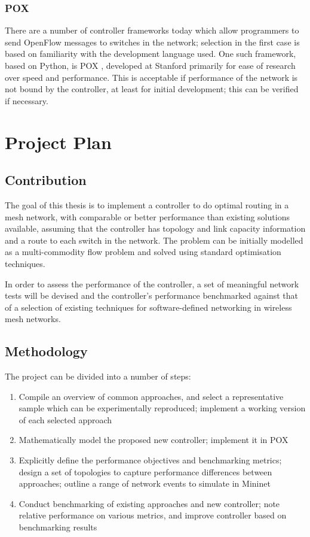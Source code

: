 \documentclass[pdftex,12pt,a4paper]{article}
\begin{document}
\subsubsection{POX}
There are a number of controller frameworks today which allow programmers to send OpenFlow messages to switches in the network; selection in the first case is based on familiarity with the development language used. One such framework, based on Python, is POX \cite{onl:pox}, developed at Stanford primarily for ease of research over speed and performance. This is acceptable if performance of the network is not bound by the controller, at least for initial development; this can be verified if necessary.

\newpage
\section{Project Plan}
\subsection{Contribution}
The goal of this thesis is to implement a controller to do optimal routing in a mesh network, with comparable or better performance than existing solutions available, assuming that the controller has topology and link capacity information and a route to each switch in the network. The problem can be initially modelled as a multi-commodity flow problem and solved using standard optimisation techniques.

In order to assess the performance of the controller, a set of meaningful network tests will be devised and the controller's performance benchmarked against that of a selection of existing techniques for software-defined networking in wireless mesh networks.

\subsection{Methodology}
The project can be divided into a number of steps:

\begin{enumerate}
\item Compile an overview of common approaches, and select a representative sample which can be experimentally reproduced; implement a working version of each selected approach
\item Mathematically model the proposed new controller; implement it in POX
\item Explicitly define the performance objectives and benchmarking metrics; design a set of topologies to capture performance differences between approaches; outline a range of network events to simulate in Mininet 
\item Conduct benchmarking of existing approaches and new controller; note relative performance on various metrics, and improve controller based on benchmarking results
\end{enumerate}
\end{document}
